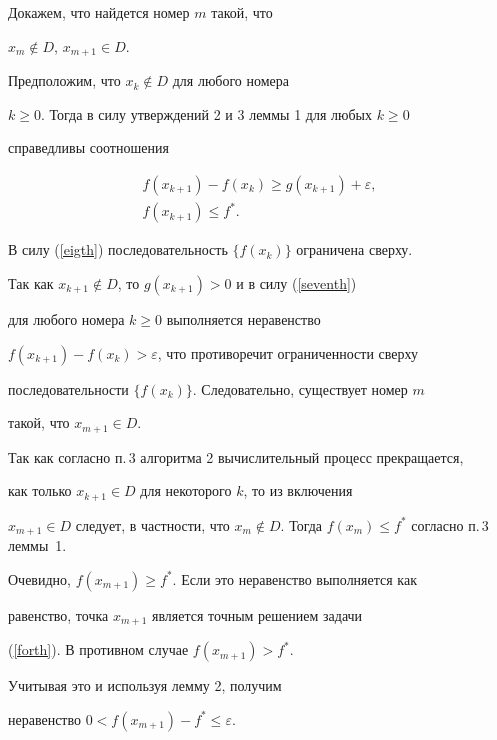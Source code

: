\begin{pf}


Докажем, что найдется номер $m$ такой, что


${x_m\notin D}$, $x_{m+1}\in D$.


Предположим, что $x_k\notin D$ для любого номера


$k\ge0$. Тогда в силу утверждений 2 и 3 леммы 1 для любых $k\ge0$


справедливы соотношения


\begin{gather}


\label{seventh}


f(x_{k+1})-f(x_k)\ge g(x_{k+1})+\varepsilon, \\


\label{eigth}


f(x_{k+1})\le f^*.


\end{gather}


В силу (\ref{eigth}) последовательность $\{f(x_k)\}$ ограничена сверху.


Так как ${x_{k+1}\notin D}$, то $g(x_{k+1})>0$ и в силу (\ref{seventh})


для любого номера $k\ge0$ выполняется неравенство


$f(x_{k+1})-f(x_k)>\varepsilon$, что противоречит ограниченности сверху


последовательности $\{f(x_k)\}$. Следовательно, существует номер $m$


такой, что $x_{m+1}\in D$.





Так как согласно п.\,3 алгоритма 2 вычислительный процесс прекращается,


как только $x_{k+1}\in D$ для некоторого $k$, то из включения


$x_{m+1}\in D$ следует, в частности, что $x_m\notin D$. Тогда $f(x_m)\le


f^*$ согласно п.\,3 леммы~1.


Очевидно, $f(x_{m+1})\ge f^*$. Если это неравенство выполняется как


равенство, точка $x_{m+1}$ является точным решением задачи


(\ref{forth}). В противном случае $f(x_{m+1})>f^*$.


Учитывая это и используя лемму 2, получим


неравенство $0<f(x_{m+1})-f^*\le\varepsilon$.


\end{pf}





